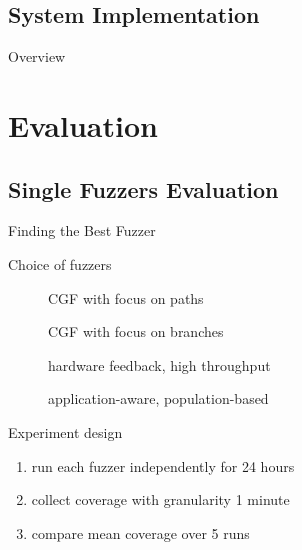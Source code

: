 \documentclass[\HandoutMode,table]{beamer}
\begin{document}
\subsection{System Implementation}

\begin{frame}{Overview}
\end{frame}

\section{Evaluation}

\subsection{Single Fuzzers Evaluation}

\begin{frame}{Finding the Best Fuzzer}
    \begin{block}{Choice of fuzzers}
        \begin{description}
            \item[\aflfast] CGF with focus on paths
            \item[\fairfuzz] CGF with focus on branches
            \item[\honggfuzz] hardware feedback, high throughput
            \item[\vuzzer] application-aware, population-based
        \end{description}
    \end{block}
    \begin{block}{Experiment design}
        \begin{enumerate}
            \item{} run each fuzzer independently for 24 hours
            \item{} collect coverage with granularity 1 minute
            \item{} compare mean coverage over 5 runs
        \end{enumerate}
    \end{block}
\end{frame}
\end{document}
